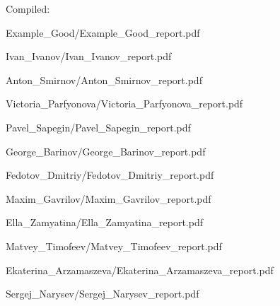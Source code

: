 \documentclass[a4paper]{article}
\begin{document}
Compiled: \DTMnow
\tableofcontents

\clearpage

{Example_Good/Example_Good_report.pdf}

{Ivan_Ivanov/Ivan_Ivanov_report.pdf}

{Anton_Smirnov/Anton_Smirnov_report.pdf}

{Victoria_Parfyonova/Victoria_Parfyonova_report.pdf}

{Pavel_Sapegin/Pavel_Sapegin_report.pdf}

{George_Barinov/George_Barinov_report.pdf}

{Fedotov_Dmitriy/Fedotov_Dmitriy_report.pdf}

{Maxim_Gavrilov/Maxim_Gavrilov_report.pdf}

{Ella_Zamyatina/Ella_Zamyatina_report.pdf}

{Matvey_Timofeev/Matvey_Timofeev_report.pdf}

{Ekaterina_Arzamaszeva/Ekaterina_Arzamaszeva_report.pdf}

{Sergej_Narysev/Sergej_Narysev_report.pdf}
\end{document}
